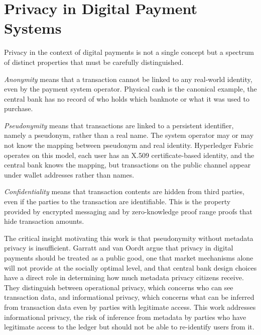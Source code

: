 \section{Privacy in Digital Payment Systems}
\label{sec:privacy_payments}

Privacy in the context of digital payments is not a single
concept but a spectrum of distinct properties that must be
carefully distinguished.

\textit{Anonymity} means that a transaction cannot be linked
to any real-world identity, even by the payment system
operator. Physical cash is the canonical example, the central
bank has no record of who holds which banknote or what it
was used to purchase.

\textit{Pseudonymity} means that transactions are linked to
a persistent identifier, namely a pseudonym, rather than a
real name. The system operator may or may not know the
mapping between pseudonym and real identity. Hyperledger
Fabric operates on this model, each user has an X.509
certificate-based identity, and the central bank knows the
mapping, but transactions on the public channel appear under
wallet addresses rather than names.

\textit{Confidentiality} means that transaction contents are
hidden from third parties, even if the parties to the
transaction are identifiable. This is the property provided
by encrypted messaging and by zero-knowledge proof range proofs that hide
transaction amounts.

The critical insight motivating this work is that
pseudonymity without metadata privacy is insufficient. Garratt
and van Oordt \cite{garratt2020} argue that privacy in
digital payments should be treated as a public good, one
that market mechanisms alone will not provide at the socially
optimal level, and that central bank design choices have
a direct role in determining how much metadata privacy
citizens receive. They distinguish between operational
privacy, which concerns who can see transaction data, and
informational privacy, which concerns what can be inferred
from transaction data even by parties with legitimate access.
This work addresses informational privacy, the risk of
inference from metadata by parties who have legitimate access
to the ledger but should not be able to re-identify users
from it.

